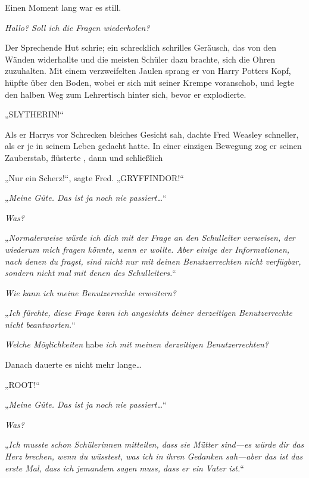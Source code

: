 Einen Moment lang war es still.

\emph{Hallo? Soll ich die Fragen wiederholen?}

Der Sprechende Hut schrie; ein schrecklich schrilles Geräusch, das von den Wänden widerhallte und die meisten Schüler dazu brachte, sich die Ohren zuzuhalten. Mit einem verzweifelten Jaulen sprang er von Harry Potters Kopf, hüpfte über den Boden, wobei er sich mit seiner Krempe voranschob, und legte den halben Weg zum Lehrertisch hinter sich, bevor er explodierte.

\later

„SLYTHERIN!“

Als er Harrys vor Schrecken bleiches Gesicht sah, dachte Fred Weasley schneller, als er je in seinem Leben gedacht hatte. In einer einzigen Bewegung zog er seinen Zauberstab, flüsterte , dann  und schließlich %

„Nur ein Scherz!“, sagte Fred. „GRYFFINDOR!“

\later

„\emph{Meine Güte. Das ist ja noch nie passiert…}“

\emph{Was?}

„\emph{Normalerweise würde ich dich mit der Frage an den Schulleiter verweisen, der wiederum mich fragen könnte, wenn er wollte. Aber einige der Informationen, nach denen du fragst, sind nicht nur mit deinen Benutzerrechten nicht verfügbar, sondern nicht mal mit denen des Schulleiters.}“

\emph{Wie kann ich meine Benutzerrechte erweitern?}

„\emph{Ich fürchte, diese Frage kann ich angesichts deiner derzeitigen Benutzerrechte nicht beantworten.}“

\emph{Welche Möglichkeiten} habe \emph{ich mit meinen derzeitigen Benutzerrechten?}

Danach dauerte es nicht mehr lange…

„ROOT!“

\later

„\emph{Meine Güte. Das ist ja noch nie passiert…}“

\emph{Was?}

„\emph{Ich musste schon Schülerinnen mitteilen, dass sie Mütter sind—es würde dir das Herz brechen, wenn du wüsstest, was ich in ihren Gedanken sah—aber das ist das erste Mal, dass ich jemandem sagen muss, dass er ein Vater ist.}“

